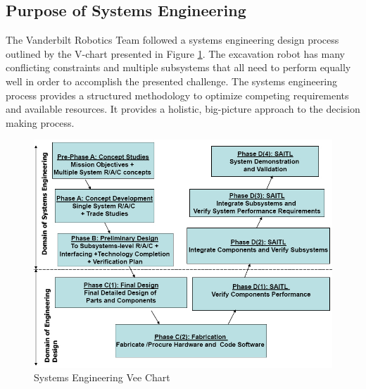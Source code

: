 \documentclass[class=article, crop=false]{standalone}
\begin{document}
	\subsection{Purpose of Systems Engineering}
	\label{subsec:systems_engineering_purpose}
	The Vanderbilt Robotics Team followed a systems engineering design process outlined by the V-chart presented in Figure \ref{fig:safety_protocol_flowsheet}. The excavation robot has many conflicting constraints and multiple subsystems that all need to perform equally well in order to accomplish the presented challenge. The systems engineering process provides a structured methodology to optimize competing requirements and available resources. It provides a holistic, big-picture approach to the decision making process. 
	
	\FloatBarrier
		\begin{figure}[h]
			\centering
			\includegraphics[width=.50\linewidth]{09_Figures/systems_engineering_vee_chart.jpg}
			\caption{Systems Engineering Vee Chart}
			\label{fig:safety_protocol_flowsheet}
		\end{figure}
		\FloatBarrier


	
\end{document}
